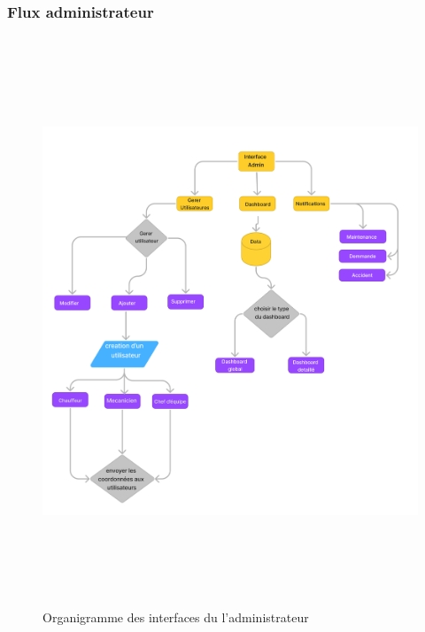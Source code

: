 \subsubsection{Flux administrateur}
\begin{figure}[htbp]
  \centering
  \includegraphics[width=1\textwidth,height=17cm]{chap2.images/org admin.png}
  \caption{Organigramme des interfaces du l'administrateur }
\end{figure}


\newpage
